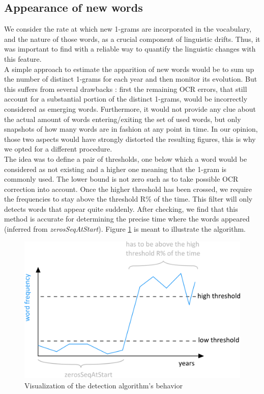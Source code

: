 \subsection{Appearance of new words}

We consider the rate at which new 1-grams are incorporated in the vocabulary, and the nature of those words,  as a crucial component of linguistic drifts. Thus, it was important to find with a reliable way to quantify the linguistic changes with this feature.\\

A simple approach to estimate the apparition of new words would be to sum up the number of distinct 1-grams for each year and then monitor its evolution. But this suffers from several drawbacks : first the remaining OCR errors, that still account for a substantial portion of the distinct 1-grams,  would be incorrectly considered as emerging words.  Furthermore, it would not provide any clue about the actual amount of words entering/exiting the set of used words, but only snapshots of how many words are in fashion at any point in time. In our opinion, those two aspects would have strongly distorted the resulting figures, this is why we opted for a different procedure.\\

The idea was to define a pair of thresholds, one below which a word would be considered as not existing and a higher one meaning that the 1-gram is commonly used. The lower bound is not zero such as to take possible OCR correction into account. Once the higher threshold has been crossed, we require the frequencies to stay above the threshold R\% of the time.  This filter will only detects words that appear quite suddenly. After checking, we find that this method is accurate for determining the precise time where the words appeared (inferred from \textit{zerosSeqAtStart}). Figure \ref{algoschema} is meant to illustrate the algorithm.\\

\begin{figure}[H]
        \includegraphics[scale=0.7]{Pictures/statistics/appearing-words/algo-schema.png}
        \caption{Visualization of the detection algorithm's behavior}
        \label{algoschema}
	\centering
\end{figure}

